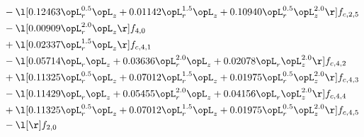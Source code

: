 \begin{alignat}{2}
& - \l[  0.12463 \opL_r^{0.5} \opL_z +  0.01142 \opL_r^{1.5} \opL_z +  0.10940 \opL_r^{0.5} \opL_z^{2.0}  \r] f_{c,2,5} \nonumber \\ 
& - \l[  0.00909 \opL_r^{2.0} \opL_z  \r] f_{4,0} \nonumber \\ 
& + \l[  0.02337 \opL_r^{1.5} \opL_z  \r] f_{c,4,1} \nonumber \\ 
& - \l[  0.05714 \opL_r \opL_z +  0.03636 \opL_r^{2.0} \opL_z +  0.02078 \opL_r \opL_z^{2.0}  \r] f_{c,4,2} \nonumber \\ 
& + \l[  0.11325 \opL_r^{0.5} \opL_z +  0.07012 \opL_r^{1.5} \opL_z +  0.01975 \opL_r^{0.5} \opL_z^{2.0}  \r] f_{c,4,3} \nonumber \\ 
& - \l[  0.11429 \opL_r \opL_z +  0.05455 \opL_r^{2.0} \opL_z +  0.04156 \opL_r \opL_z^{2.0}  \r] f_{c,4,4} \nonumber \\ 
& + \l[  0.11325 \opL_r^{0.5} \opL_z +  0.07012 \opL_r^{1.5} \opL_z +  0.01975 \opL_r^{0.5} \opL_z^{2.0}  \r] f_{c,4,5} \nonumber \\ 
& - \l[  \r] f_{2,0} \nonumber \\ 
\end{alignat} 



